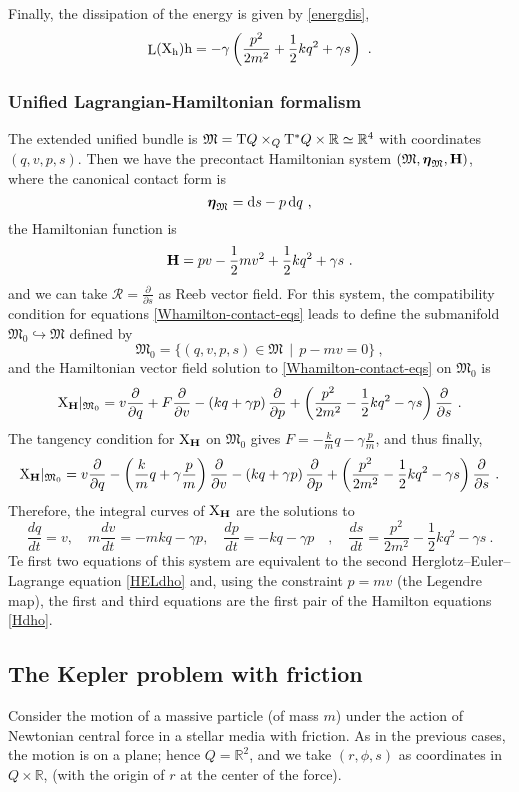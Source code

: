 \documentclass[12pt]{report}
\def\dst{\displaystyle}
\def\derpar#1#2{\frac{\partial{#1}}{\partial{#2}}}
\def\d{{\rm d}}
\def\Real{\mathbb{R}}
\def\bmeta{\mbox{\boldmath $\eta$}}
\def\X{{\rm X}}
\def\Tan{{\rm T}}
\def\Lie{\mathop{\rm L}\nolimits}
\newcommand{\Reeb}{\mathcal{R}}
\begin{document}
Finally, the dissipation of the energy is given by \eqref{energdis},
$$
\Lie(\X_{\rm h}){\rm h}=-\gamma\left(\frac{p^2}{2m^2} + \frac{1}{2}kq^2 + \gamma s\right)\ .
$$


\subsubsection{Unified Lagrangian-Hamiltonian formalism}


The extended unified bundle is $\mathfrak{M}=\Tan Q\times_Q\Tan^*Q\times\Real\simeq\Real^4$
with coordinates $(q,v,p,s)$.
Then we have the precontact Hamiltonian system
$(\mathfrak{M},\bmeta_{\mathfrak{M}},{\bf H})$,
where the canonical contact form is
$$
\bmeta_{\mathfrak{M}}=\d s-p\,\d q \ ,
$$
the Hamiltonian function is
$$
{\bf H}=pv-\frac{1}{2}mv^{2}+\frac{1}{2}kq^{2}+\gamma s \ .
$$
and we can take $\dst \Reeb=\derpar{}{s}$ as Reeb vector field.
For this system, the compatibility condition for equations \eqref{Whamilton-contact-eqs} leads to define the submanifold $\mathfrak{M}_0\hookrightarrow\mathfrak{M}$
defined by
$$
\mathfrak{M}_0=\{ (q,v,p,s)\in\mathfrak{M}\,\mid\,  p-mv=0 \} \ ,
$$
and the Hamiltonian vector field solution to \eqref{Whamilton-contact-eqs} on $\mathfrak{M}_0$ is
$$
\X_{\bf H}\vert_{\mathfrak{M}_0}=
v\derpar{}{q}+F\derpar{}{v}-
\left(kq+\gamma p\right)\derpar{}{p}
+\left(\frac{p^2}{2m^2}-\frac{1}{2}kq^2-\gamma s\right)\derpar{}{s}\ .
$$
The tangency condition for $\X_{\bf H}$ on $\mathfrak{M}_0$ gives
$\dst F=-\frac{k}{m}q-\gamma\frac{p}{m}$,
and thus finally,
$$
\X_{\bf H}\vert_{\mathfrak{M}_0}=
v\derpar{}{q}-\left(\frac{k}{m}q+\gamma\frac{p}{m}\right)\derpar{}{v}-
\left(kq+\gamma p\right)\derpar{}{p}
+\left(\frac{p^2}{2m^2}-\frac{1}{2}kq^2-\gamma s\right)\derpar{}{s}\ .
$$
Therefore, the integral curves of $\X_{\bf H}$ are the solutions to
$$
\frac{dq}{dt}=v ,\quad
m\frac{dv}{dt}=-mkq-\gamma p ,\quad
\frac{dp}{dt}=-kq-\gamma p \quad , 
\quad
\frac{ds}{dt}=\frac{p^2}{2m^2}-\frac{1}{2}kq^2-\gamma s \ .
$$
Te first two equations of this system are equivalent to the
second Herglotz--Euler--Lagrange equation
\eqref{HELdho}
and, using the constraint $p=mv$ (the Legendre map),
the first and third equations are the first pair of the Hamilton equations \eqref{Hdho}.


\subsection{The Kepler problem with friction}


Consider the motion of a massive particle (of mass $m$)
under the action of Newtonian central force
in a stellar media with friction.
As in the previous cases, the motion is on a plane; hence
$Q=\Real^2$, and we take $(r,\phi,s)$ as coordinates in $Q\times\Real$,
(with the origin of $r$ at the center of the force).
\end{document}
